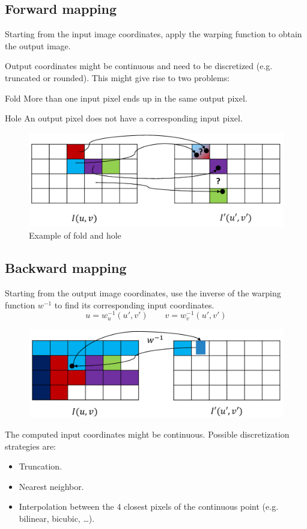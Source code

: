 \subsection{Forward mapping}

Starting from the input image coordinates, apply the warping function to obtain the output image.

Output coordinates might be continuous and need to be discretized (e.g. truncated or rounded).
This might give rise to two problems:
\begin{descriptionlist}
    \item[Fold] More than one input pixel ends up in the same output pixel.
    \item[Hole] An output pixel does not have a corresponding input pixel.
\end{descriptionlist}

\begin{figure}[H]
    \centering
    \includegraphics[width=0.55\linewidth]{./img/_forward_warping.pdf}
    \caption{Example of fold and hole}
\end{figure}


\subsection{Backward mapping}

Starting from the output image coordinates, use the inverse of the warping function $w^{-1}$ to find its corresponding input coordinates.
\[ u = w_u^{-1}(u', v') \hspace{2em} v = w_v^{-1}(u', v') \]

\begin{figure}[H]
    \centering
    \includegraphics[width=0.55\linewidth]{./img/_backward_warping.pdf}
\end{figure}

The computed input coordinates might be continuous. Possible discretization strategies are:
\begin{itemize}
    \item Truncation.
    \item Nearest neighbor.
    \item Interpolation between the 4 closest pixels of the continuous point (e.g. bilinear, bicubic, \dots).
\end{itemize}


